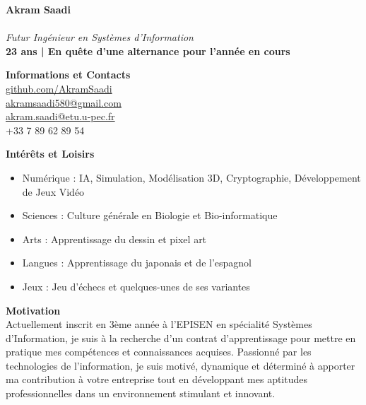 \documentclass[a4paper,11pt]{article} %
\newcommand{\cvsection}[1]{\vspace{1em}\noindent\textbf{\textcolor{cvhighlight}{\LARGE #1}}\vspace{0.5em}\\}
\newcommand{\cvitem}[1]{\item #1}
\begin{document}
\begin{paracol}{2}

\begin{minipage}[t]{\linewidth}
\colorbox{sectionbg1}{
    \parbox{\linewidth}{
        \vspace{0.25em}
        {\fontsize{24}{28}\selectfont \textbf{Akram Saadi}\\\\}
        \fontsize{12}{14}\selectfont\faUserGraduate \hspace{0.5em}\textit{Futur Ingénieur en Systèmes d'Information} \\
        \textbf{23 ans | En quête d'une alternance pour l'année en cours}
        \vspace{0.25em}
    }
}
\medskip
\colorbox{sectionbg2}{
    \parbox{\linewidth}{
        \cvsection{\faAddressCard \hspace{0.5em} Informations et Contacts}
        \faGithub \hspace{0.5em} \href{https://github.com/AkramSaadi}{github.com/AkramSaadi} \\
        \faEnvelope \hspace{0.5em} \href{mailto:akramsaadi580@gmail.com}{akramsaadi580@gmail.com} \\
        \faEnvelopeOpen \hspace{0.5em} \href{mailto:akram.saadi@etu.u-pec.fr}{akram.saadi@etu.u-pec.fr} \\
        \faPhone \hspace{0.5em} +33 7 89 62 89 54
    }
}
\end{minipage}
\smallskip

\colorbox{sectionbg1}{
    \parbox{\linewidth}{
        \cvsection{\faHeart \hspace{0.5em} Intérêts et Loisirs}
        \vspace{-1em}
        \begin{itemize}[leftmargin=0.5cm, itemsep=0pt, topsep=0pt]
            \cvitem{Numérique : IA, Simulation, Modélisation 3D, Cryptographie, Développement de Jeux Vidéo}
            \cvitem{Sciences : Culture générale en Biologie et Bio-informatique}
            \cvitem{Arts : Apprentissage du dessin et pixel art}
            \cvitem{Langues : Apprentissage du japonais et de l'espagnol}
            \cvitem{Jeux : Jeu d'échecs et quelques-unes de ses variantes}
        \end{itemize}
    }
}
\medskip

\colorbox{sectionbg2}{
    \parbox{\linewidth}{
        \cvsection{\faComment \hspace{0.5em} Motivation}
        Actuellement inscrit en 3ème année à l'EPISEN en spécialité Systèmes d'Information, je suis à la recherche d'un contrat d'apprentissage pour mettre en pratique mes compétences et connaissances acquises. Passionné par les technologies de l'information, je suis motivé, dynamique et déterminé à apporter ma contribution à votre entreprise tout en développant mes aptitudes professionnelles dans un environnement stimulant et innovant.
    }
}
\medskip


\end{paracol}
\end{document}
